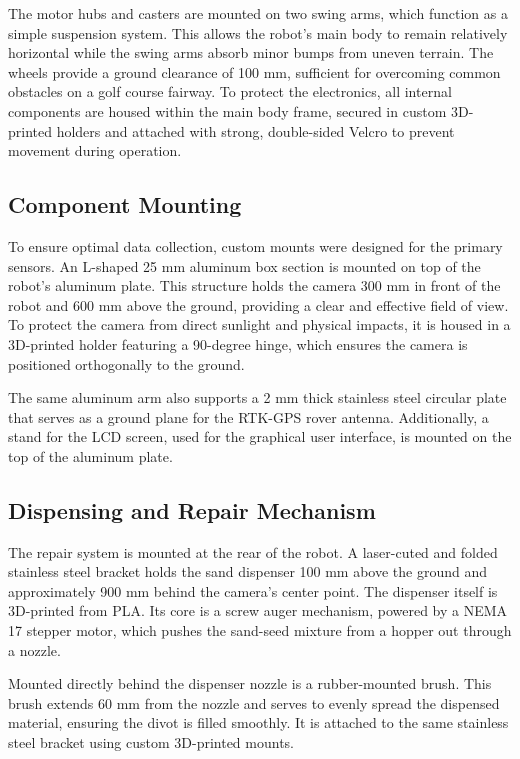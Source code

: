 The motor hubs and casters are mounted on two swing arms, which function as a simple suspension system. This allows the robot's main body to remain relatively horizontal while the swing arms absorb minor bumps from uneven terrain. The wheels provide a ground clearance of 100 mm, sufficient for overcoming common obstacles on a golf course fairway. To protect the electronics, all internal components are housed within the main body frame, secured in custom 3D-printed holders and attached with strong, double-sided Velcro to prevent movement during operation.

\subsection{Component Mounting}
\label{ssec:component_mounting}
To ensure optimal data collection, custom mounts were designed for the primary sensors. An L-shaped 25 mm aluminum box section is mounted on top of the robot's aluminum plate. This structure holds the camera 300 mm in front of the robot and 600 mm above the ground, providing a clear and effective field of view. To protect the camera from direct sunlight and physical impacts, it is housed in a 3D-printed holder featuring a 90-degree hinge, which ensures the camera is positioned orthogonally to the ground.

The same aluminum arm also supports a 2 mm thick stainless steel circular plate that serves as a ground plane for the RTK-GPS rover antenna. Additionally, a stand for the LCD screen, used for the graphical user interface, is mounted on the top of the aluminum plate.

\subsection{Dispensing and Repair Mechanism}
\label{ssec:dispenser_mechanism}
The repair system is mounted at the rear of the robot. A laser-cuted and folded stainless steel bracket holds the sand dispenser 100 mm above the ground and approximately 900 mm behind the camera's center point. The dispenser itself is 3D-printed from \gls{PLA}. Its core is a screw auger mechanism, powered by a NEMA 17 stepper motor, which pushes the sand-seed mixture from a hopper out through a nozzle.

Mounted directly behind the dispenser nozzle is a rubber-mounted brush. This brush extends 60 mm from the nozzle and serves to evenly spread the dispensed material, ensuring the divot is filled smoothly. It is attached to the same stainless steel bracket using custom 3D-printed mounts.

